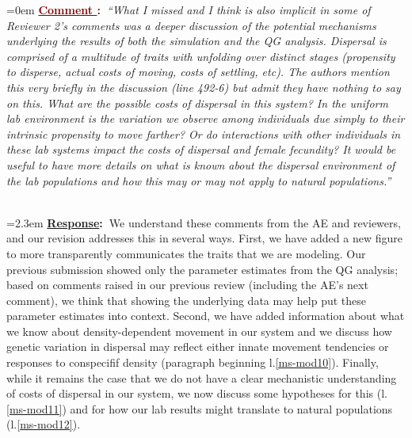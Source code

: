 \documentclass[12pt]{article}
\newcounter{cN}
\newcommand{\comment}[1]{
	\vspace{2em}
	\refstepcounter{cN} %
	\noindent \hangindent=0em \textbf{\textcolor{Maroon}{\uline{Comment \thecN}:~}}\emph{``#1''}
	}
\newcommand{\response}[1]{
	\\[0.25em]
	\hangindent=2.3em \textbf{\textcolor{NavyBlue}{\uline{Response}:~}}#1
	}
\begin{document}
\comment{What I missed and I think is also implicit in some of Reviewer 2’s comments was a deeper discussion of the potential mechanisms underlying the results of both the simulation and the QG analysis.
Dispersal is comprised of a multitude of traits with unfolding over distinct stages (propensity to disperse, actual costs of moving, costs of settling, etc).
The authors mention this very briefly in the discussion (line 492-6) but admit they have nothing to say on this.
What are the possible costs of dispersal in this system?
In the uniform lab environment is the variation we observe among individuals due simply to their intrinsic propensity to move farther?
Or do interactions with other individuals in these lab systems impact the costs of dispersal and female fecundity?
It would be useful to have more details on what is known about the dispersal environment of the lab populations and how this may or may not apply to natural populations.}
\response{We understand these comments from the AE and reviewers, and our revision addresses this in several ways. 
First, we have added a new figure to more transparently communicates the traits that we are modeling.
Our previous submission showed only the parameter estimates from the QG analysis; based on comments raised in our previous review (including the AE's next comment), we think that showing the underlying data may help put these parameter estimates into context.
Second, we have added information about what we know about density-dependent movement in our system and we discuss how genetic variation in dispersal may reflect either innate movement tendencies or responses to conspecifif density (paragraph beginning l.\ref{ms-mod10}).
Finally, while it remains the case that we do not have a clear mechanistic understanding of costs of dispersal in our system, we now discuss some hypotheses for this (l.\ref{ms-mod11}) and for how our lab results might translate to natural populations (l.\ref{ms-mod12}).
}
\end{document}
